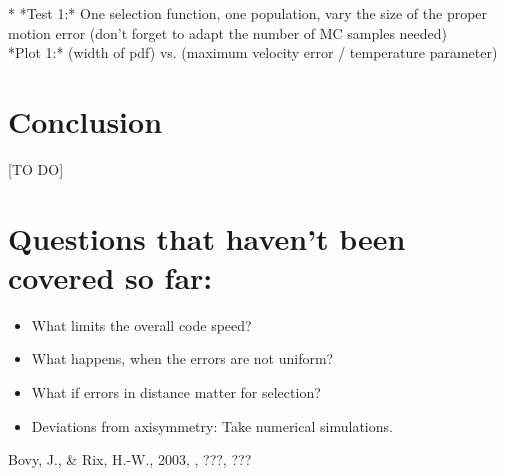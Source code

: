 \documentclass[12pt,preprint]{aastex}
\begin{document}
* *Test 1:* One selection function, one population, vary the size of the proper motion error (don't forget to adapt the number of MC samples needed) \\
*Plot 1:* (width of pdf) vs. (maximum velocity error / temperature parameter)

\section{Conclusion}

[TO DO]

\section{Questions that haven't been covered so far:}

\begin{itemize}
\item What limits the overall code speed?
\item What happens, when the errors are not uniform?
\item What if errors in distance matter for selection?
\item Deviations from axisymmetry: Take numerical simulations.
\end{itemize}



\begin{thebibliography}{}
 Bovy, J., \& Rix, H.-W., 2003, \apj, ???, ???
\end{thebibliography}
\end{document}
